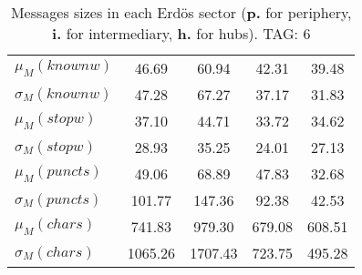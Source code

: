 \begin{table}[h!]
\begin{center}
\begin{tabular}{| l || c | c | c | c |}
$\mu_M(knownw)$ & 46.69  & 60.94  & 42.31  & 39.48 \\
$\sigma_M(knownw)$ & 47.28  & 67.27  & 37.17  & 31.83 \\\hline
$\mu_M(stopw)$ & 37.10  & 44.71  & 33.72  & 34.62 \\
$\sigma_M(stopw)$ & 28.93  & 35.25  & 24.01  & 27.13 \\\hline
$\mu_M(puncts)$ & 49.06  & 68.89  & 47.83  & 32.68 \\
$\sigma_M(puncts)$ & 101.77  & 147.36  & 92.38  & 42.53 \\\hline
$\mu_M(chars)$ & 741.83  & 979.30  & 679.08  & 608.51 \\
$\sigma_M(chars)$ & 1065.26  & 1707.43  & 723.75  & 495.28 \\\hline
\end{tabular}
\caption{Messages sizes in each Erd\"os sector ({{\bf p.}} for periphery, {{\bf i.}} for intermediary, {{\bf h.}} for hubs). TAG: 6}
\end{center}
\end{table}